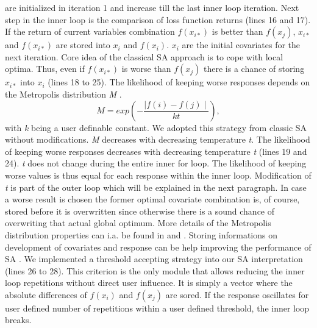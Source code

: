 are initialized in iteration 1 and increase till the last inner loop iteration. Next step in the inner loop is the comparison of loss function returns (lines 16 and 17). If the return of current variables combination $f(x_{i*})$ is better than $f(x_j)$, $x_{i*}$ and $f(x_{i*})$ are stored into $x_{i}$ and $f(x_{i})$. $x_{i}$ are the initial covariates for the next iteration. Core idea of the classical SA approach is to cope with local optima. Thus, even if $f(x_{i*})$ is worse than $f(x_{j})$ there is a chance of storing $x_{i*}$ into $x_{i}$ (lines 18 to 25). The likelihood of keeping worse responses depends on the Metropolis distribution \textit{M} \citep{metropolis_1953}.
\begin{equation}
\label{eq:eq1}
M = exp \left(-\frac{\mid f(i)-f(j)\mid}{kt}\right),
\end{equation}
with \textit{k} being a user definable constant. We adopted this strategy from classic SA without modifications. \textit{M} decreases with decreasing temperature \textit{t}. The likelihood of keeping worse responses decreases with decreasing temperature \textit{t} (lines 19 and 24). \textit{t} does not change during the entire inner for loop. The likelihood of keeping worse values is thus equal for each response within the inner loop. Modification of \textit{t} is part of the outer loop which will be explained in the next paragraph. In case a worse result is chosen the former optimal covariate combination is, of course, stored before it is overwritten since otherwise there is a sound chance of overwriting that actual global optimum. More details of the Metropolis distribution properties can i.a. be found in \citet{kirkpatrick_1983} and \citet{metropolis_1953}. Storing informations on development of covariates and response can be help improving the performance of SA \citep{lin_1995, hansen_2012}. We implemented a threshold accepting strategy \citep{dueck_1990} into our SA interpretation (lines 26 to 28). This criterion is the only module that allows reducing the inner loop repetitions without direct user influence. It is simply a vector where the absolute differences of $f(x_{i})$ and $f(x_j)$ are sored. If the response oscillates for user defined number of repetitions within a user defined threshold, the inner loop breaks.

